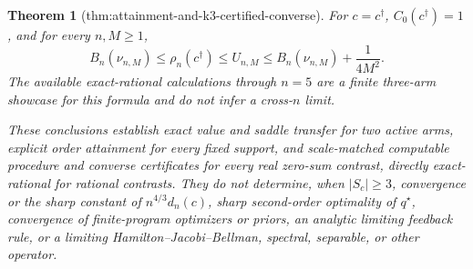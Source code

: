 \documentclass{article}
\newtheorem{theorem}{Theorem}
\begin{document}
\begin{theorem}[thm:attainment-and-k3-certified-converse]
For \(c=c^\dagger\), \(C_0(c^\dagger)=1\), and for every \(n,M\geq1\),
\[
 B_n(\nu_{n,M})\leq\rho_n(c^\dagger)\leq U_{n,M}
 \leq B_n(\nu_{n,M})+\frac1{4M^2}.
\]
The available exact-rational calculations through \(n=5\) are a finite three-arm showcase for this formula and do not infer a cross-\(n\) limit.

These conclusions establish exact value and saddle transfer for two active arms, explicit order attainment for every fixed support, and scale-matched computable procedure and converse certificates for every real zero-sum contrast, directly exact-rational for rational contrasts. They do not determine, when \(|S_c|\geq3\), convergence or the sharp constant of \(n^{4/3}d_n(c)\), sharp second-order optimality of \(q^\star\), convergence of finite-program optimizers or priors, an analytic limiting feedback rule, or a limiting Hamilton--Jacobi--Bellman, spectral, separable, or other operator.
\end{theorem}
\end{document}
